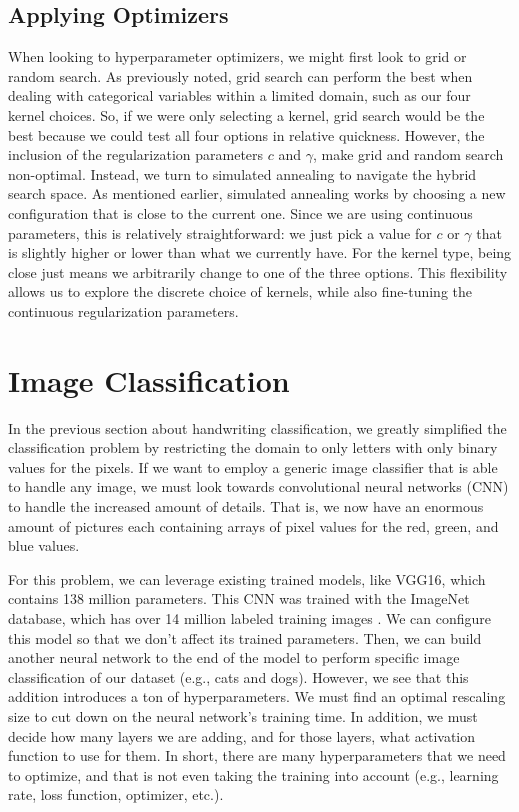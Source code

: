 \documentclass[stu,12pt,floatsintext]{apa7}
\begin{document}
\subsection{Applying Optimizers}

When looking to hyperparameter optimizers, we might first look to grid or random search. As previously noted, grid search can perform the best when dealing with categorical variables within a limited domain, such as our four kernel choices. So, if we were only selecting a kernel, grid search would be the best because we could test all four options in relative quickness. However, the inclusion of the regularization parameters \(c\) and \(\gamma\), make grid and random search non-optimal. Instead, we turn to simulated annealing to navigate the hybrid search space. As mentioned earlier, simulated annealing works by choosing a new configuration that is close to the current one. Since we are using continuous parameters, this is relatively straightforward: we just pick a value for \(c\) or \(\gamma\) that is slightly higher or lower than what we currently have. For the kernel type, being close just means we arbitrarily change to one of the three options. This flexibility allows us to explore the discrete choice of kernels, while also fine-tuning the continuous regularization parameters.  

\section{Image Classification}

In the previous section about handwriting classification, we greatly simplified the classification problem by restricting the domain to only letters with only binary values for the pixels. If we want to employ a generic image classifier that is able to handle any image, we must look towards convolutional neural networks (CNN) to handle the increased amount of details. That is, we now have an enormous amount of pictures each containing arrays of pixel values for the red, green, and blue values. 

For this problem, we can leverage existing trained models, like VGG16, which contains 138 million parameters. This CNN was trained with the ImageNet database, which has over 14 million labeled training images \parencite{gabrielferrer_2025_csci}. We can configure this model so that we don't affect its trained parameters. Then, we can build another neural network to the end of the model to perform specific image classification of our dataset (e.g., cats and dogs). However, we see that this addition introduces a ton of hyperparameters. We must find an optimal rescaling size to cut down on the neural network's training time. In addition, we must decide how many layers we are adding, and for those layers, what activation function to use for them. In short, there are many hyperparameters that we need to optimize, and that is not even taking the training into account (e.g., learning rate, loss function, optimizer, etc.). 
\end{document}
